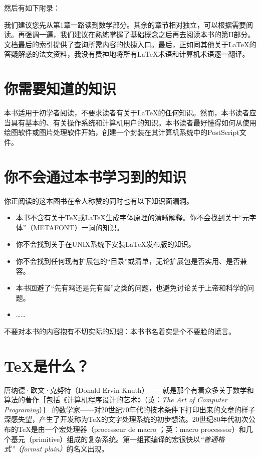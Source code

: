 
然后有如下附录：


我们建议您先从第1章一路读到数学部分。其余的章节相对独立，可以根据需要阅读。再强调一遍，我们建议在熟练掌握了基础概念之后再去阅读本书的第II部分。文档最后的索引提供了查询所需内容的快捷入口。最后，正如同其他关于\LaTeX 的答疑解惑的法文资料，我没有费神地将所有\LaTeX 术语和计算机术语逐一翻译。

\section*{你需要知道的知识}

本书适用于初学者阅读，不要求读者有关于\LaTeX 的任何知识。然而，本书读者应当具有基本的、有关操作系统和计算机用户的知识。本书读者最好懂得如何从使用绘图软件或图片处理软件开始，创建一个封装在其计算机系统中的PostScript文件。

\section*{你不会通过本书学习到的知识}

你正阅读的这本图书在令人称赞的同时也有以下知识面漏洞。

\begin{itemize}
    \item 本书不含有关于\TeX 或\LaTeX 生成字体原理的清晰解释。你不会找到关于“元字体”（METAFONT）一词的知识。
    \item 你不会找到关于在UNIX系统下安装\LaTeX 发布版的知识。
    \item 你不会找到任何现有扩展包的“目录”或清单，无论扩展包是否实用、是否兼容。
    \item 本书回避了“先有鸡还是先有蛋”之类的问题，也避免讨论关于上帝和科学的问题。
    \item ……
\end{itemize}

\begin{exclamation}
不要对本书的内容抱有不切实际的幻想：本书书名着实是个不要脸的谎言。
\end{exclamation}

\section*{\TeX 是什么？}

唐纳德·欧文·克努特（Donald Ervin Knuth）——就是那个有着众多关于数学和算法的著作［包括《计算机程序设计的艺术》（英：\textit{The Art of Computer Programing}）］%
的数学家——对20世纪70年代的技术条件下打印出来的文章的样子深感失望，产生了开发称为\TeX 的文字处理系统的初步想法。20世纪80年代初次公布的\TeX 是由一个宏处理器（processeur de macro ；英：macro processsor）和几个基元（primitive）组成的复杂系统。第一组预编译的宏很快以\textit{“普通格式”（format plain）}的名义出现。

